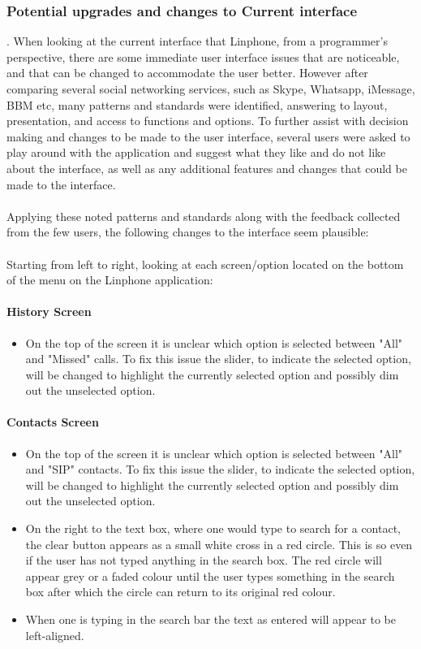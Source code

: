 \documentclass[11pt]{article}
\begin{document}
\subsubsection{Potential upgrades and changes to Current interface}.\newline
When looking at the current interface that Linphone, from a programmer's perspective, there are some immediate user interface issues that are noticeable, and that can be changed to accommodate the user better. However after comparing several social networking services, such as Skype, Whatsapp, iMessage, BBM etc, many patterns and standards were identified, answering to layout, presentation, and access to functions and options. To further assist with decision making and changes to be made to the user interface, several users were asked to play around with the application and suggest what they like and do not like about the interface, as well as any additional features and changes that could be made to the interface.\\\\
Applying these noted patterns and standards along with the feedback collected from the few users, the following changes to the interface seem plausible: \\\\
Starting from left to right, looking at each screen/option located on the bottom of the menu on the Linphone application:
\paragraph{History Screen}
\begin{itemize}
\item On the top of the screen it is unclear which option is selected between "All" and "Missed" calls. To fix this issue the slider, to indicate the selected option, will be changed to highlight the currently selected option and possibly dim out the unselected option.
\end{itemize}

\paragraph{Contacts Screen}
\begin{itemize}
\item On the top of the screen it is unclear which option is selected between "All" and "SIP" contacts. To fix this issue the slider, to indicate the selected option, will be changed to highlight the currently selected option and possibly dim out the unselected option.

\item On the right to the text box, where one would type to search for a contact, the clear button appears as a small white cross in a red circle. This is so even if the user has not typed anything in the search box. The red circle will appear grey or a faded colour until the user types something in the search box after which the circle can return to its original red colour. 

\item When one is typing in the search bar the text as entered will appear to be left-aligned.
\end{itemize}
\end{document}
